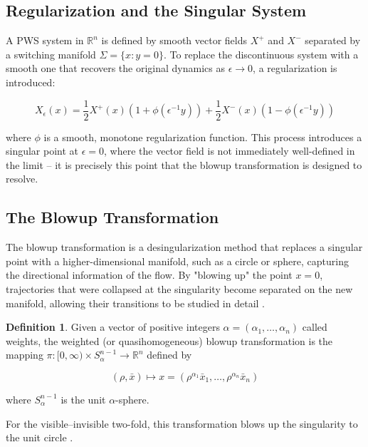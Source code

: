 \documentclass[12pt, a4paper, oneside]{book}
\theoremstyle{plain}
\theoremstyle{definition}
\newtheorem{definition}[theorem]{Definition}
\theoremstyle{remark}
\theoremstyle{definition}
\begin{document}
\subsection{Regularization and the Singular System}

A PWS system in $\mathbb{R}^n$ is defined by smooth vector fields $X^+$ and $X^-$ separated by a switching manifold $\Sigma = \{x : y = 0\}$. To replace the discontinuous system with a smooth one that recovers the original dynamics as $\epsilon \to 0$, a regularization is introduced:

\begin{equation}
    X_\epsilon(x) = \frac{1}{2}X^+(x)(1 + \phi(\epsilon^{-1}y)) + \frac{1}{2}X^-(x)(1 - \phi(\epsilon^{-1}y))
\end{equation}

where $\phi$ is a smooth, monotone regularization function. This process introduces a singular point at $\epsilon = 0$, where the vector field is not immediately well-defined in the limit -- it is precisely this point that the blowup transformation is designed to resolve.

\subsection{The Blowup Transformation}

The blowup transformation is a desingularization method that replaces a singular point with a higher-dimensional manifold, such as a circle or sphere, capturing the directional information of the flow. By "blowing up" the point $x=0$, trajectories that were collapsed at the singularity become separated on the new manifold, allowing their transitions to be studied in detail \cite{kristiansen2019resolution}.

\begin{definition}
Given a vector of positive integers $\alpha = (\alpha_1, \dots, \alpha_n)$ called weights, the weighted (or quasihomogeneous) blowup transformation is the mapping $\pi: [0, \infty) \times S^{n-1}_{\alpha} \to \mathbb{R}^n$ defined by

\begin{equation}
    (\rho, \bar{x}) \mapsto x = (\rho^{\alpha_1} \bar{x}_1, \dots, \rho^{\alpha_n} \bar{x}_n)
\end{equation}

where $S^{n-1}_{\alpha}$ is the unit $\alpha$-sphere.
\end{definition}

For the visible--invisible two-fold, this transformation blows up the singularity to the unit circle \cite{kristiansen2019resolution}.
\end{document}
